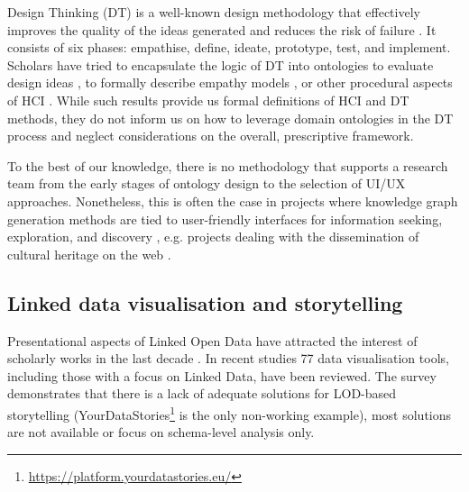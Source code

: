 \documentclass[manuscript]
{acmart}
\begin{document}
Design Thinking (DT) \cite{rowe_design_1991, brown_design_2008, dorst_core_2011, norman_design_2013} is a well-known design methodology that effectively improves the quality of the ideas generated and reduces the risk of failure \cite{liedtka_evaluating_2017}. It consists of six phases: empathise, define, ideate, prototype, test, and implement. Scholars have tried to encapsulate the logic of DT into ontologies to evaluate design ideas \cite{ramaprasad_design_2014}, to formally describe empathy models \cite{pileggi_knowledge_2021}, or other procedural aspects of HCI \cite{paulheim_ui_2013, silva_formal_2017, bakaev_ontology_2010, bakaev_application_2016}. While such results provide us formal definitions of HCI and DT methods, they do not inform us on how to leverage domain ontologies in the DT process and neglect considerations on the overall, prescriptive framework.

To the best of our knowledge, there is no methodology that supports a research team from the early stages of ontology design to the selection of UI/UX approaches. Nonetheless, this is often the case in projects where knowledge graph generation methods are tied to user-friendly interfaces for information seeking, exploration, and discovery \cite{hyvonen_using_2020}, e.g. projects dealing with the dissemination of cultural heritage on the web \cite{konstantakis_adding_2020}.

\subsection{Linked data visualisation and storytelling}

Presentational aspects of Linked Open Data have attracted the interest of scholarly works in the last decade \cite{brunetti_formal_2013, anutariya_vizlod_2018}. 
In recent studies \cite{desimoni_empirical_2020} 77 data visualisation tools, including those with a focus on Linked Data, have been reviewed. The survey demonstrates that there is a lack of adequate solutions for LOD-based storytelling (YourDataStories\footnote{\url{https://platform.yourdatastories.eu/}} \cite{petasis2018yourdatastories} is the only non-working example), most solutions are not available or focus on schema-level analysis only.
\end{document}
